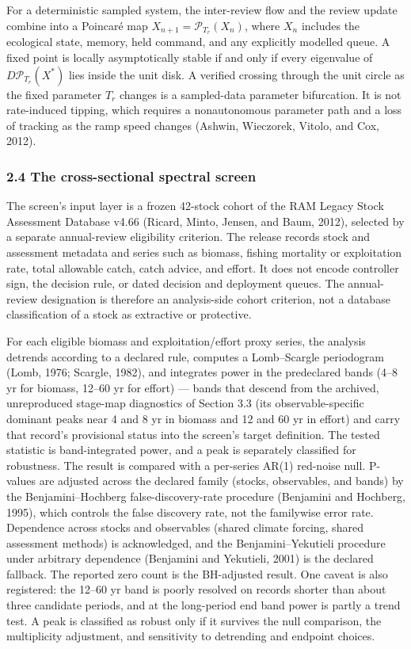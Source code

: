 \documentclass[11pt]{article}
\begin{document}
For a deterministic sampled system, the inter-review flow and the review
update combine into a Poincar\'e map \(X_{n+1}=\mathcal P_{T_r}(X_n)\),
where \(X_n\) includes the ecological state, memory, held command, and
any explicitly modelled queue. A fixed point is locally asymptotically
stable if and only if every eigenvalue of \(D\mathcal P_{T_r}(X^*)\)
lies inside the unit disk. A verified crossing through the unit circle
as the fixed parameter \(T_r\) changes is a sampled-data parameter
bifurcation. It is not rate-induced tipping, which requires a
nonautonomous parameter path and a loss of tracking as the ramp speed
changes (Ashwin, Wieczorek, Vitolo, and Cox, 2012).

\subsubsection{2.4 The cross-sectional spectral
screen}\label{the-cross-sectional-spectral-screen}

The screen's input layer is a frozen 42-stock cohort of the RAM Legacy
Stock Assessment Database v4.66 (Ricard, Minto, Jensen, and Baum, 2012),
selected by a separate annual-review eligibility criterion. The release
records stock and assessment metadata and series such as biomass,
fishing mortality or exploitation rate, total allowable catch, catch
advice, and effort. It does not encode controller sign, the decision
rule, or dated decision and deployment queues. The annual-review
designation is therefore an analysis-side cohort criterion, not a
database classification of a stock as extractive or protective.

For each eligible biomass and exploitation/effort proxy series, the
analysis detrends according to a declared rule, computes a Lomb--Scargle
periodogram (Lomb, 1976; Scargle, 1982), and integrates power in the
predeclared bands (4--8 yr for biomass, 12--60 yr for effort) --- bands
that descend from the archived, unreproduced stage-map diagnostics of
Section 3.3 (its observable-specific dominant peaks near 4 and 8 yr in
biomass and 12 and 60 yr in effort) and carry that record's provisional
status into the screen's target definition. The tested statistic is
band-integrated power, and a peak is separately classified for
robustness. The result is compared with a per-series AR(1) red-noise
null. P-values are adjusted across the declared family (stocks,
observables, and bands) by the Benjamini--Hochberg false-discovery-rate
procedure (Benjamini and Hochberg, 1995), which controls the false
discovery rate, not the familywise error rate. Dependence across stocks
and observables (shared climate forcing, shared assessment methods) is
acknowledged, and the Benjamini--Yekutieli procedure under arbitrary
dependence (Benjamini and Yekutieli, 2001) is the declared fallback. The
reported zero count is the BH-adjusted result. One caveat is also
registered: the 12--60 yr band is poorly resolved on records shorter
than about three candidate periods, and at the long-period end band
power is partly a trend test. A peak is classified as robust only if it
survives the null comparison, the multiplicity adjustment, and
sensitivity to detrending and endpoint choices.
\end{document}
